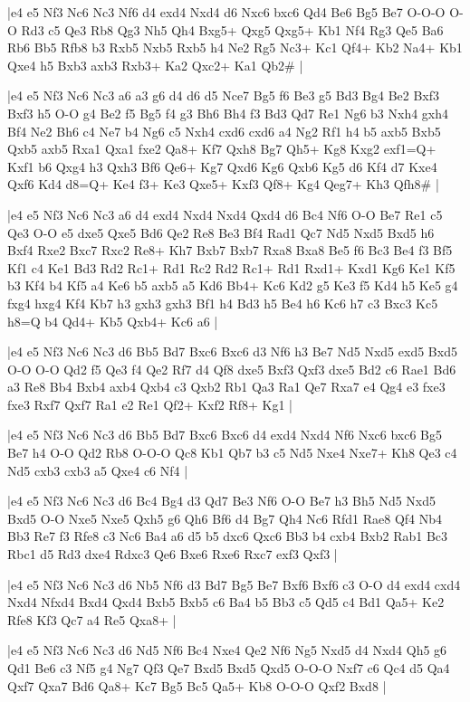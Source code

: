 \whitename{}
\blackname{}
\makegametitle
|e4 e5 Nf3 Nc6 Nc3 Nf6 d4 exd4 Nxd4 d6 Nxc6 bxc6 Qd4 Be6 Bg5 Be7 O-O-O O-O Rd3 c5 Qe3 Rb8 Qg3 Nh5 Qh4 Bxg5+ Qxg5 Qxg5+ Kb1 Nf4 Rg3 Qe5 Ba6 Rb6 Bb5 Rfb8 b3 Rxb5 Nxb5 Rxb5 h4 Ne2 Rg5 Nc3+ Kc1 Qf4+ Kb2 Na4+ Kb1 Qxe4 h5 Bxb3 axb3 Rxb3+ Ka2 Qxc2+ Ka1 Qb2\#  |

\whitename{}
\blackname{}
\makegametitle
|e4 e5 Nf3 Nc6 Nc3 a6 a3 g6 d4 d6 d5 Nce7 Bg5 f6 Be3 g5 Bd3 Bg4 Be2 Bxf3 Bxf3 h5 O-O g4 Be2 f5 Bg5 f4 g3 Bh6 Bh4 f3 Bd3 Qd7 Re1 Ng6 b3 Nxh4 gxh4 Bf4 Ne2 Bh6 c4 Ne7 b4 Ng6 c5 Nxh4 cxd6 cxd6 a4 Ng2 Rf1 h4 b5 axb5 Bxb5 Qxb5 axb5 Rxa1 Qxa1 fxe2 Qa8+ Kf7 Qxh8 Bg7 Qh5+ Kg8 Kxg2 exf1=Q+ Kxf1 b6 Qxg4 h3 Qxh3 Bf6 Qe6+ Kg7 Qxd6 Kg6 Qxb6 Kg5 d6 Kf4 d7 Kxe4 Qxf6 Kd4 d8=Q+ Ke4 f3+ Ke3 Qxe5+ Kxf3 Qf8+ Kg4 Qeg7+ Kh3 Qfh8\#  |

\whitename{}
\blackname{}
\makegametitle
|e4 e5 Nf3 Nc6 Nc3 a6 d4 exd4 Nxd4 Nxd4 Qxd4 d6 Bc4 Nf6 O-O Be7 Re1 c5 Qe3 O-O e5 dxe5 Qxe5 Bd6 Qe2 Re8 Be3 Bf4 Rad1 Qc7 Nd5 Nxd5 Bxd5 h6 Bxf4 Rxe2 Bxc7 Rxc2 Re8+ Kh7 Bxb7 Bxb7 Rxa8 Bxa8 Be5 f6 Bc3 Be4 f3 Bf5 Kf1 c4 Ke1 Bd3 Rd2 Rc1+ Rd1 Rc2 Rd2 Rc1+ Rd1 Rxd1+ Kxd1 Kg6 Ke1 Kf5 b3 Kf4 b4 Kf5 a4 Ke6 b5 axb5 a5 Kd6 Bb4+ Kc6 Kd2 g5 Ke3 f5 Kd4 h5 Ke5 g4 fxg4 hxg4 Kf4 Kb7 h3 gxh3 gxh3 Bf1 h4 Bd3 h5 Be4 h6 Kc6 h7 c3 Bxc3 Kc5 h8=Q b4 Qd4+ Kb5 Qxb4+ Kc6 a6  |

\whitename{}
\blackname{}
\makegametitle
|e4 e5 Nf3 Nc6 Nc3 d6 Bb5 Bd7 Bxc6 Bxc6 d3 Nf6 h3 Be7 Nd5 Nxd5 exd5 Bxd5 O-O O-O Qd2 f5 Qe3 f4 Qe2 Rf7 d4 Qf8 dxe5 Bxf3 Qxf3 dxe5 Bd2 c6 Rae1 Bd6 a3 Re8 Bb4 Bxb4 axb4 Qxb4 c3 Qxb2 Rb1 Qa3 Ra1 Qe7 Rxa7 e4 Qg4 e3 fxe3 fxe3 Rxf7 Qxf7 Ra1 e2 Re1 Qf2+ Kxf2 Rf8+ Kg1  |

\whitename{}
\blackname{}
\makegametitle
|e4 e5 Nf3 Nc6 Nc3 d6 Bb5 Bd7 Bxc6 Bxc6 d4 exd4 Nxd4 Nf6 Nxc6 bxc6 Bg5 Be7 h4 O-O Qd2 Rb8 O-O-O Qc8 Kb1 Qb7 b3 c5 Nd5 Nxe4 Nxe7+ Kh8 Qe3 c4 Nd5 cxb3 cxb3 a5 Qxe4 c6 Nf4  |

\whitename{}
\blackname{}
\makegametitle
|e4 e5 Nf3 Nc6 Nc3 d6 Bc4 Bg4 d3 Qd7 Be3 Nf6 O-O Be7 h3 Bh5 Nd5 Nxd5 Bxd5 O-O Nxe5 Nxe5 Qxh5 g6 Qh6 Bf6 d4 Bg7 Qh4 Nc6 Rfd1 Rae8 Qf4 Nb4 Bb3 Re7 f3 Rfe8 c3 Nc6 Ba4 a6 d5 b5 dxc6 Qxc6 Bb3 b4 cxb4 Bxb2 Rab1 Bc3 Rbc1 d5 Rd3 dxe4 Rdxc3 Qe6 Bxe6 Rxe6 Rxc7 exf3 Qxf3  |

\whitename{}
\blackname{}
\makegametitle
|e4 e5 Nf3 Nc6 Nc3 d6 Nb5 Nf6 d3 Bd7 Bg5 Be7 Bxf6 Bxf6 c3 O-O d4 exd4 cxd4 Nxd4 Nfxd4 Bxd4 Qxd4 Bxb5 Bxb5 c6 Ba4 b5 Bb3 c5 Qd5 c4 Bd1 Qa5+ Ke2 Rfe8 Kf3 Qc7 a4 Re5 Qxa8+  |

\whitename{}
\blackname{}
\makegametitle
|e4 e5 Nf3 Nc6 Nc3 d6 Nd5 Nf6 Bc4 Nxe4 Qe2 Nf6 Ng5 Nxd5 d4 Nxd4 Qh5 g6 Qd1 Be6 c3 Nf5 g4 Ng7 Qf3 Qe7 Bxd5 Bxd5 Qxd5 O-O-O Nxf7 c6 Qc4 d5 Qa4 Qxf7 Qxa7 Bd6 Qa8+ Kc7 Bg5 Bc5 Qa5+ Kb8 O-O-O Qxf2 Bxd8  |

